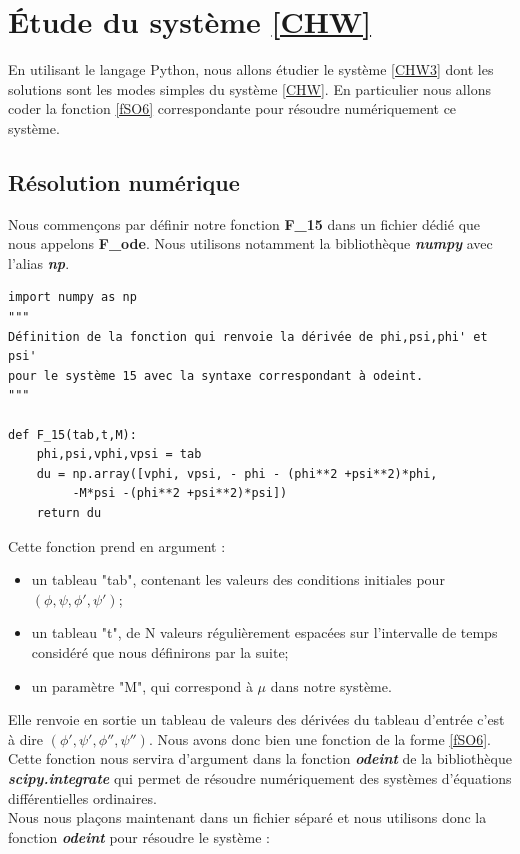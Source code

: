\documentclass[11pt,a4paper]{article}
\begin{document}
\pagebreak
\section{Étude du système \eqref{CHW}}

En utilisant le langage Python, nous allons étudier le système \eqref{CHW3} dont les solutions sont les modes simples du système \eqref{CHW}.
En particulier nous allons coder la fonction \eqref{fSO6} correspondante pour résoudre numériquement ce système.

    \subsection{Résolution numérique}
    
Nous commençons par définir notre fonction \textbf{F\_15} dans un fichier dédié que nous appelons \textbf{F\_ode}. Nous utilisons notamment la bibliothèque \textbf{\textit{numpy}} avec l'alias \textbf{\textit{np}}.\\ 

\begin{verbatim}
import numpy as np
"""
Définition de la fonction qui renvoie la dérivée de phi,psi,phi' et psi' 
pour le système 15 avec la syntaxe correspondant à odeint.
"""

def F_15(tab,t,M):
    phi,psi,vphi,vpsi = tab
    du = np.array([vphi, vpsi, - phi - (phi**2 +psi**2)*phi, 
         -M*psi -(phi**2 +psi**2)*psi])
    return du

\end{verbatim} 

Cette fonction prend en argument : 
\begin{itemize}
\item un tableau "tab", contenant les valeurs des conditions initiales pour $(\phi, \psi, \phi',\psi')$;
\item un tableau "t", de N valeurs régulièrement espacées sur l'intervalle de temps considéré que nous définirons par la suite;
\item un paramètre "M", qui correspond à $\mu$ dans notre système. 
\end{itemize}
Elle renvoie en sortie un tableau de valeurs des dérivées du tableau d'entrée c'est à dire $(\phi', \psi', \phi'',\psi'')$. Nous avons donc bien une fonction de la forme \eqref{fSO6}.
Cette fonction nous servira d'argument dans la fonction \textbf{\textit{odeint}} de la bibliothèque \textit{\textbf{scipy.integrate}} qui permet de résoudre numériquement des systèmes d'équations différentielles ordinaires.\\
Nous nous plaçons maintenant dans un fichier séparé et nous utilisons donc la fonction \textit{\textbf{odeint}} pour résoudre le système :\\
\end{document}
